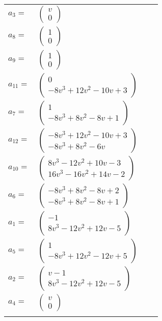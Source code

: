 \documentclass[1p]{elsarticle_modified}
\theoremstyle{definition}
\begin{document}
\begin{tabular}{m{7pt} m{180pt} m{7pt} m{180pt} }
\flushright $a_{3}=$&$\begin{pmatrix}v\\0\end{pmatrix}$ \\
\flushright $a_{8}=$&$\begin{pmatrix}1\\0\end{pmatrix}$ \\
\flushright $a_{9}=$&$\begin{pmatrix}1\\0\end{pmatrix}$ \\
\flushright $a_{11}=$&$\begin{pmatrix}0\\-8 v^3+12 v^2-10 v+3\end{pmatrix}$ \\
\flushright $a_{7}=$&$\begin{pmatrix}1\\-8 v^3+8 v^2-8 v+1\end{pmatrix}$ \\
\flushright $a_{12}=$&$\begin{pmatrix}-8 v^3+12 v^2-10 v+3\\-8 v^3+8 v^2-6 v\end{pmatrix}$ \\
\flushright $a_{10}=$&$\begin{pmatrix}8 v^3-12 v^2+10 v-3\\16 v^3-16 v^2+14 v-2\end{pmatrix}$ \\
\flushright $a_{6}=$&$\begin{pmatrix}-8 v^3+8 v^2-8 v+2\\-8 v^3+8 v^2-8 v+1\end{pmatrix}$ \\
\flushright $a_{1}=$&$\begin{pmatrix}-1\\8 v^3-12 v^2+12 v-5\end{pmatrix}$ \\
\flushright $a_{5}=$&$\begin{pmatrix}1\\-8 v^3+12 v^2-12 v+5\end{pmatrix}$ \\
\flushright $a_{2}=$&$\begin{pmatrix}v-1\\8 v^3-12 v^2+12 v-5\end{pmatrix}$ \\
\flushright $a_{4}=$&$\begin{pmatrix}v\\0\end{pmatrix}$\\&\end{tabular}
\end{document}
